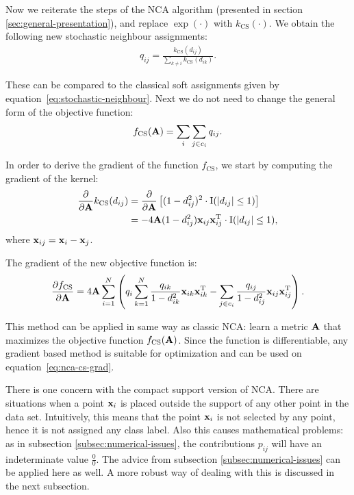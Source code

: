 	Now we reiterate the steps of the NCA algorithm (presented in section \ref{sec:general-presentation}), and replace $\exp(\cdot)$ with $k_\text{CS}(\cdot)$. We obtain the following new stochastic neighbour assignments:
	\begin{align}
		q_{ij} = \frac{k_{\text{CS}}(d_{ij})}{\sum_{k\neq i} k_{\text{CS}}(d_{ik})}.
		\label{eq:stochastic-neighbours-cs}
	\end{align}
	
	These can be compared to the classical soft assignments given by equation~\eqref{eq:stochastic-neighbour}. Next we do not need to change the general form of the objective function: 
	\begin{align}
		f_\text{CS}(\mathbf{A}) = \sum_{i}\sum_{j\in c_i} q_{ij}.
	\end{align}
	
	In order to derive the gradient of the function $f_\text{CS}$, we start by computing the gradient of the kernel:
	\begin{align}
		\frac{\partial}{\partial\mathbf{A}}k_\text{CS}(d_{ij}) 
		&= 
	\frac{\partial}{\partial\mathbf{A}}\left[(1-d_{ij}^2)^2\cdot\mathrm{I}(\left|d_{ij}\right|\le
	1)\right]\notag\\
		&= -4\mathbf{A}(1-d_{ij}^2)  \mathbf{x}_{ij} \mathbf{x}_{ij}^\mathrm{T} \cdot
	\mathrm{I}(\left|d_{ij}\right|\le 1),\label{eq:nca-cs-grad-kernel}
	\end{align}
	where $\mathbf{x}_{ij}=\mathbf{x}_i-\mathbf{x}_j$.
	
	The gradient of the new objective function is:
	\begin{align}
		\frac{\partial f_\text{CS}}{\partial \mathbf{A}}=4\mathbf{A}\sum_{i=1}^{N}
		\left(
		q_i \sum_{k=1}^N \frac{q_{ik}}{1-d_{ik}^2} \mathbf{x}_{ik}\mathbf{x}_{ik}^{\textrm{T}}
		- \sum_{j\in c_i} \frac{q_{ij}}{1-d_{ij}^2}\mathbf{x}_{ij}\mathbf{x}_{ij}^{\textrm{T}} 
		\right).
		\label{eq:nca-cs-grad}
	\end{align}
	
	This method can be applied in same way as classic NCA: learn a metric $\mathbf{A}$ that maximizes the objective function $f_\text{CS}(\mathbf{A})$. Since the function is differentiable, any gradient based method is suitable for optimization and can be used on equation~\eqref{eq:nca-cs-grad}.
	
	There is one concern with the compact support version of NCA. There are situations when a point $\mathbf{x}_i$ is placed outside the support of any other point in the data set. Intuitively, this means that the point $\mathbf{x}_i$ is not selected by any point, hence it is not assigned any class label. Also this causes mathematical problems: as in subsection \ref{subsec:numerical-issues}, the contributions $p_{ij}$ will have an indeterminate value $\frac{0}{0}$. The advice from subsection \ref{subsec:numerical-issues} can be applied here as well. A more robust way of dealing with this is discussed in the next subsection.
	
